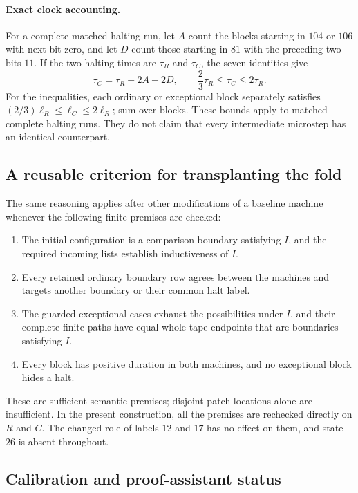 \paragraph{Exact clock accounting.}
For a complete matched halting run, let $A$ count the blocks starting in
$104$ or $106$ with next bit zero, and let $D$ count those starting in
$81$ with the preceding two bits $11$.  If the two halting times are
$\tau_R$ and $\tau_C$, the seven identities give
\[
 \tau_C=\tau_R+2A-2D,
 \qquad \frac{2}{3}\tau_R\leq\tau_C\leq2\tau_R.
\]
For the inequalities, each ordinary or exceptional block separately
satisfies $(2/3)\ell_R\leq\ell_C\leq2\ell_R$; sum over blocks.
These bounds apply to matched complete halting runs.  They do not claim
that every intermediate microstep has an identical counterpart.

\subsection{A reusable criterion for transplanting the fold}

The same reasoning applies after other modifications of a baseline
machine whenever the following finite premises are checked:
\begin{enumerate}
\item The initial configuration is a comparison boundary satisfying $I$,
and the required incoming lists establish inductiveness of $I$.
\item Every retained ordinary boundary row agrees between the machines
and targets another boundary or their common halt label.
\item The guarded exceptional cases exhaust the possibilities under $I$,
and their complete finite paths have equal whole-tape endpoints that are
boundaries satisfying $I$.
\item Every block has positive duration in both machines, and no
exceptional block hides a halt.
\end{enumerate}
These are sufficient semantic premises; disjoint patch locations alone
are insufficient.  In the present construction, all the premises are
rechecked directly on $R$ and $C$.  The changed role of labels $12$ and
$17$ has no effect on them, and state $26$ is absent throughout.

\subsection{Calibration and proof-assistant status}

